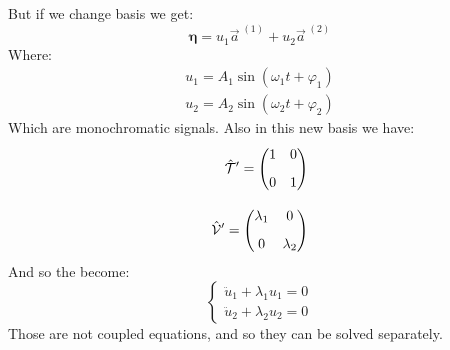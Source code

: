 But if we change basis we get:
\begin{equation}
    \boldsymbol{\eta} = u_1 \vec{a}^{\;(1)} + u_2 \vec{a}^{\;(2)}
\end{equation}
Where:
\begin{equation}
    \begin{split}
        u_1 = A_1 \sin(\omega_1 t + \varphi_1)\\[8pt]
        u_2 = A_2 \sin(\omega_2 t + \varphi_2)
    \end{split}
\end{equation}
Which are monochromatic signals. Also in this new basis we have:
\begin{equation}
    \begin{split}
        \hat{\mathcal{T}}' = \begin{pmatrix}
            1 & 0\\[8pt]
            0 & 1
        \end{pmatrix}\\[8pt]
        \hat{\mathcal{V}}' = \begin{pmatrix}
            \lambda_1 & 0\\[8pt]
            0 & \lambda_2
        \end{pmatrix}
    \end{split}
\end{equation}
And so the \eleref\;become:
\begin{equation}
    \begin{cases}
        \ddot{u}_1+\lambda_1 u_1 = 0\\[8pt]
        \ddot{u}_2+\lambda_2 u_2 = 0
    \end{cases}
\end{equation}
Those are not coupled equations, and so they can be solved separately.



